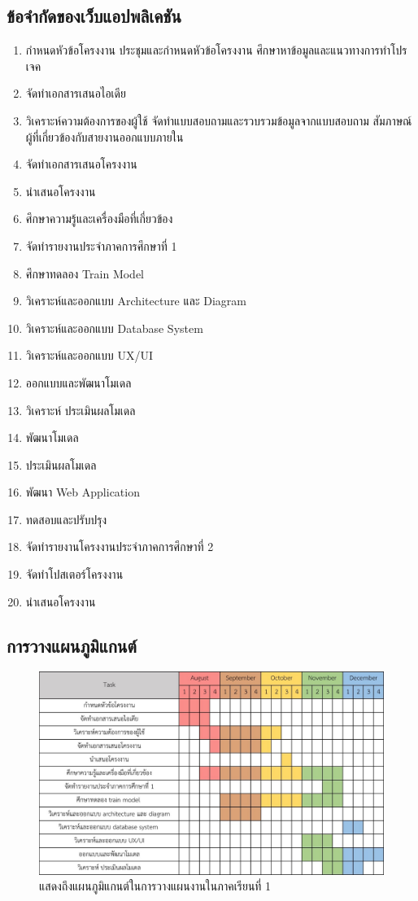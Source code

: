 \documentclass[12pt,oneside,openright,a4paper]{cpe-thai-project}
\begin{document}
\subsection{ข้อจำกัดของเว็บแอปพลิเคชัน}
\begin{enumerate}
\item กำหนดหัวข้อโครงงาน  ประชุมและกำหนดหัวข้อโครงงาน  ศึกษาหาข้อมูลและแนวทางการทำโปรเจค
\item จัดทำเอกสารเสนอไอเดีย
\item วิเคราะห์ความต้องการของผู้ใช้  จัดทำแบบสอบถามและรวบรวมข้อมูลจากแบบสอบถาม   สัมภาษณ์ผู้ที่เกี่ยวข้องกับสายงานออกแบบภายใน
\item จัดทำเอกสารเสนอโครงงาน 
\item นำเสนอโครงงาน
\item ศึกษาความรู้และเครื่องมือที่เกี่ยวข้อง 
\item จัดทำรายงานประจำภาคการศึกษาที่ 1
\item ศึกษาทดลอง Train Model
\item วิเคราะห์และออกแบบ Architecture และ Diagram 
\item วิเคราะห์และออกแบบ Database System
\item วิเคราะห์และออกแบบ UX/UI 
\item ออกแบบและพัฒนาโมเดล
\item วิเคราะห์ ประเมินผลโมเดล
\item พัฒนาโมเดล
\item ประเมินผลโมเดล
\item พัฒนา Web Application
\item ทดสอบและปรับปรุง
\item จัดทำรายงานโครงงานประจำภาคการศึกษาที่ 2
\item จัดทำโปสเตอร์โครงงาน
\item นำเสนอโครงงาน
\end{enumerate}

\subsection{การวางแผนภูมิแกนต์}

\begin{figure}[!h]\centering
\includegraphics[width=13.8cm]{image/gantt-chart.jpg}
\caption{แสดงถึงแผนภูมิแกนต์ในการวางแผนงานในภาคเรียนที่ 1}
\label{fig:gantt-chart}
\end{figure}
\end{document}
